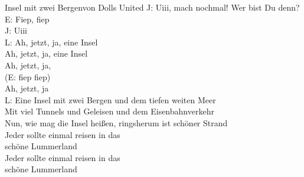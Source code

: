 \begin{lied}{Insel mit zwei Bergen}{von Dolls United}
J: Uiii, mach nochmal! Wer bist Du denn?\\
E: Fiep, fiep\\
J: Uiii\\
L: Ah, jetzt, ja, eine Insel\\
Ah, jetzt, ja, eine Insel\\
Ah, jetzt, ja,\\
(E: fiep fiep)\\
Ah, jetzt, ja\\
L: Eine Insel mit zwei Bergen und dem tiefen weiten Meer\\
Mit viel Tunnels und Geleisen und dem Eisenbahnverkehr\\
Nun, wie mag die Insel heißen, ringsherum ist schöner Strand\\
Jeder sollte einmal reisen in das\\
schöne Lummerland\\
Jeder sollte einmal reisen in das\\
schöne Lummerland\\
\end{lied}